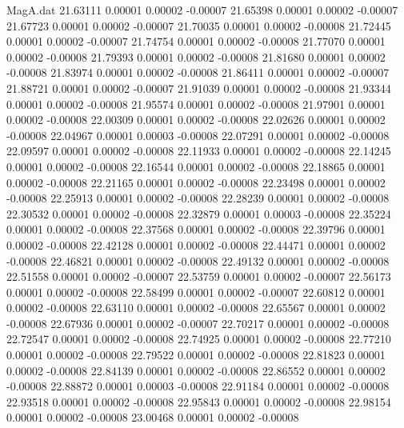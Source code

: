 \begin{filecontents}{MagA.dat}
  21.63111    0.00001    0.00002   -0.00007
  21.65398    0.00001    0.00002   -0.00007
  21.67723    0.00001    0.00002   -0.00007
  21.70035    0.00001    0.00002   -0.00008
  21.72445    0.00001    0.00002   -0.00007
  21.74754    0.00001    0.00002   -0.00008
  21.77070    0.00001    0.00002   -0.00008
  21.79393    0.00001    0.00002   -0.00008
  21.81680    0.00001    0.00002   -0.00008
  21.83974    0.00001    0.00002   -0.00008
  21.86411    0.00001    0.00002   -0.00007
  21.88721    0.00001    0.00002   -0.00007
  21.91039    0.00001    0.00002   -0.00008
  21.93344    0.00001    0.00002   -0.00008
  21.95574    0.00001    0.00002   -0.00008
  21.97901    0.00001    0.00002   -0.00008
  22.00309    0.00001    0.00002   -0.00008
  22.02626    0.00001    0.00002   -0.00008
  22.04967    0.00001    0.00003   -0.00008
  22.07291    0.00001    0.00002   -0.00008
  22.09597    0.00001    0.00002   -0.00008
  22.11933    0.00001    0.00002   -0.00008
  22.14245    0.00001    0.00002   -0.00008
  22.16544    0.00001    0.00002   -0.00008
  22.18865    0.00001    0.00002   -0.00008
  22.21165    0.00001    0.00002   -0.00008
  22.23498    0.00001    0.00002   -0.00008
  22.25913    0.00001    0.00002   -0.00008
  22.28239    0.00001    0.00002   -0.00008
  22.30532    0.00001    0.00002   -0.00008
  22.32879    0.00001    0.00003   -0.00008
  22.35224    0.00001    0.00002   -0.00008
  22.37568    0.00001    0.00002   -0.00008
  22.39796    0.00001    0.00002   -0.00008
  22.42128    0.00001    0.00002   -0.00008
  22.44471    0.00001    0.00002   -0.00008
  22.46821    0.00001    0.00002   -0.00008
  22.49132    0.00001    0.00002   -0.00008
  22.51558    0.00001    0.00002   -0.00007
  22.53759    0.00001    0.00002   -0.00007
  22.56173    0.00001    0.00002   -0.00008
  22.58499    0.00001    0.00002   -0.00007
  22.60812    0.00001    0.00002   -0.00008
  22.63110    0.00001    0.00002   -0.00008
  22.65567    0.00001    0.00002   -0.00008
  22.67936    0.00001    0.00002   -0.00007
  22.70217    0.00001    0.00002   -0.00008
  22.72547    0.00001    0.00002   -0.00008
  22.74925    0.00001    0.00002   -0.00008
  22.77210    0.00001    0.00002   -0.00008
  22.79522    0.00001    0.00002   -0.00008
  22.81823    0.00001    0.00002   -0.00008
  22.84139    0.00001    0.00002   -0.00008
  22.86552    0.00001    0.00002   -0.00008
  22.88872    0.00001    0.00003   -0.00008
  22.91184    0.00001    0.00002   -0.00008
  22.93518    0.00001    0.00002   -0.00008
  22.95843    0.00001    0.00002   -0.00008
  22.98154    0.00001    0.00002   -0.00008
  23.00468    0.00001    0.00002   -0.00008

\end{filecontents}
